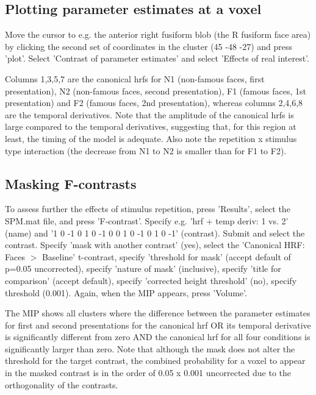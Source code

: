 \documentclass[a4paper,titlepage]{book}
\begin{document}
\subsection{Plotting parameter estimates at a voxel}

Move the cursor to e.g. the anterior right fusiform blob (the R fusiform face area) by clicking the second set of coordinates in the cluster (45 -48 -27) and press 'plot'. Select 'Contrast of parameter estimates' and select 'Effects of real interest'.

Columns 1,3,5,7 are the canonical hrfs for N1 (non-famous faces, first presentation), N2 (non-famous faces, second presentation), F1 (famous faces, 1st presentation) and F2 (famous faces, 2nd presentation), whereas columns 2,4,6,8 are the temporal derivatives. Note that the amplitude of the canonical hrfs is large compared to the temporal derivatives, suggesting that, for this region at least, the timing of the model is adequate. Also note the repetition x stimulus type interaction (the decrease from N1 to N2 is smaller than for F1 to F2).

\subsection{Masking F-contrasts}

To assess further the effects of stimulus repetition, press 'Results', select the SPM.mat file, and press 'F-contrast'. Specify e.g. 'hrf + temp deriv: 1 vs. 2' (name) and
'1 0 -1 0 1 0 -1 0
0 1 0 -1 0 1 0 -1' (contrast). Submit and select the contrast. Specify 'mask with another contrast' (yes), select the 'Canonical HRF: Faces $>$ Baseline' t-contrast, specify 'threshold for mask' (accept default of p=0.05 uncorrected), specify 'nature of mask' (inclusive), specify 'title for comparison' (accept default), specify 'corrected height threshold' (no), specify threshold (0.001). 
Again, when the MIP appears, press 'Volume'.

The MIP shows all clusters where the difference between the parameter estimates for first and second presentations for the canonical hrf OR its temporal derivative is significantly different from zero AND the canonical hrf for all four conditions is significantly larger than zero. Note that although the mask does not alter the threshold for the target contrast, the combined probability for a voxel to appear in the masked contrast is in the order of 0.05 x 0.001 uncorrected due to the orthogonality of the contrasts. 
\end{document}
